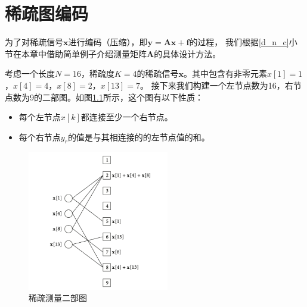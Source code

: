 \documentclass[AutoFakeBold]{LZUThesis}
\begin{document}

\chapter{稀疏图编码}
\label{2}

为了对稀疏信号$\mathbf{x}$进行编码（压缩），即$\mathbf{y} = \mathbf{Ax} + \mathbf{f}$的过程，
我们根据\ref{d_n_c}小节在本章中借助简单例子介绍测量矩阵$\mathbf{A}$的具体设计方法。

考虑一个长度$N=16$，稀疏度$K=4$的稀疏信号$\mathbf{x}$。其中包含有非零元素$x[1] = 1$，$x[4] = 4$，$x[8] = 2$，$x[13] = 7$。
接下来我们构建一个左节点数为16，右节点数为9的二部图。如图\ref{fig_bip_graph}所示，这个图有以下性质：

\begin{itemize}
    \item 每个左节点$x[k]$都连接至少一个右节点。
    \item 每个右节点$y_r$的值是与其相连接的的左节点值的和。
\end{itemize}

\begin{figure}[H]
    \centering
    \includegraphics[width=0.55\textwidth]{figures/bip_g.png}
    \caption{稀疏测量二部图}
    \label{fig_bip_graph}
\end{figure}
\end{document}
